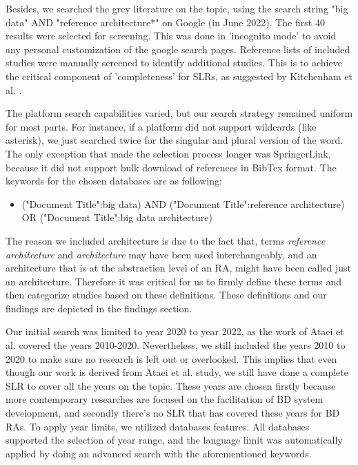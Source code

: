 \documentclass{ieeeaccess}
\begin{document}
Besides, we searched the grey literature on the topic, using the search string "big data" AND "reference architecture*" on Google (in June 2022). The first 40 results were selected for screening. This was done in 'incognito mode' to avoid any personal customization of the google search pages. Reference lists of included studies were manually screened to identify additional studies. This is to achieve the critical component of 'completeness' for SLRs, as suggested by Kitchenham et al. \cite{kitchenham2015evidence}.

The platform search capabilities varied, but our search strategy remained uniform for most parts. For instance, if a platform did not support wildcards (like asterisk), we just searched twice for the singular and plural version of the word. The only exception that made the selection process longer was SpringerLink, because it did not support bulk download of references in BibTex format. The keywords for the chosen databases are as following: 

\begin{itemize}
    \item ("Document Title":big data) AND ("Document Title":reference architecture) OR ("Document Title":big data architecture)
\end{itemize}

The reason we included architecture is due to the fact that, terms \emph{reference architecture} and \emph{architecture} may have been used interchangeably, and an architecture that is at the abstraction level of an RA, might have been called just an architecture. Therefore it was critical for us to firmly define these terms and then categorize studies based on these definitions. These definitions and our findings are depicted in the findings section.

Our initial search was limited to year 2020 to year 2022, as the work of Ataei et al. \cite{AtaeiACIS} covered the years 2010-2020. Nevertheless, we still included the years 2010 to 2020 to make sure no research is left out or overlooked. This implies that even though our work is derived from Ataei et al. \cite{AtaeiACIS} study, we still have done a complete SLR to cover all the years on the topic. These years are chosen firstly because more contemporary researches are focused on the facilitation of BD system development, and secondly there's no SLR that has covered these years for BD RAs. To apply year limits, we utilized databases features. All databases supported the selection of year range, and the language limit was automatically applied by doing an advanced search with the aforementioned keywords.
\end{document}
